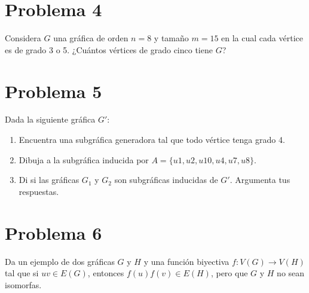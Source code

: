 \documentclass[12pt]{article}
\begin{document}
\section*{Problema 4}

Considera \( G \) una gráfica de orden \( n = 8 \) y tamaño \( m = 15 \) en la cual cada vértice es de grado 3 o 5. ¿Cuántos vértices de grado cinco tiene \( G \)?

\section*{Problema 5}

Dada la siguiente gráfica \( G' \):


\begin{enumerate}
    \item Encuentra una subgráfica generadora tal que todo vértice tenga grado 4.
    \item Dibuja a la subgráfica inducida por \( A = \{u1, u2, u10, u4, u7, u8\} \).
    \item Di si las gráficas \( G_1 \) y \( G_2 \) son subgráficas inducidas de \( G' \). Argumenta tus respuestas.
\end{enumerate}


\section*{Problema 6}

Da un ejemplo de dos gráficas \( G \) y \( H \) y una función biyectiva \( f: V(G) \rightarrow V(H) \) tal que si \( uv \in E(G) \), entonces \( f(u)f(v) \in E(H) \), pero que \( G \) y \( H \) no sean isomorfas.

\end{document}
